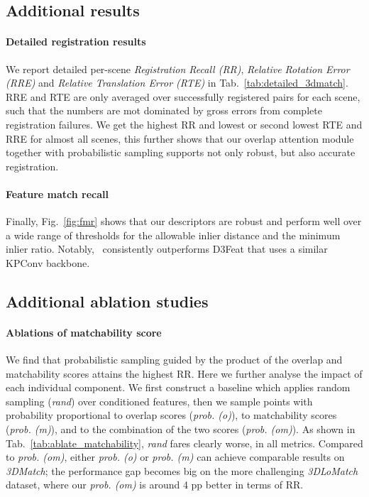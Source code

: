 
\subsection{Additional results}
\label{sec:additional_results_supp}
\paragraph{Detailed registration results}
We report detailed per-scene \textit{Registration Recall (RR)}, \textit{Relative Rotation Error (RRE)} and \textit{Relative Translation Error (RTE)} in Tab.~\ref{tab:detailed_3dmatch}. RRE and RTE are only averaged over successfully registered pairs for each scene, such that the numbers are mot dominated by gross errors from complete registration failures. We get the highest RR and lowest or second lowest RTE and RRE for almost all scenes, this further shows that our overlap attention module together with probabilistic sampling supports not only robust, but also accurate registration.  


\paragraph{Feature match recall}
Finally, Fig.~\ref{fig:fmr} shows that our descriptors are robust and perform well over a wide range of thresholds for the allowable inlier distance and the minimum inlier ratio. Notably, \acro\ consistently outperforms D3Feat that uses a similar KPConv backbone.


\subsection{Additional ablation studies}
\label{sec:addtional_ablation_supp}


\paragraph{Ablations of matchability score}
We find that probabilistic sampling guided by the product of the overlap and matchability scores attains the highest RR. Here we further analyse the impact of each individual component. We first construct a baseline which applies random sampling (\textit{rand}) over conditioned features, then we sample points with probability proportional to overlap scores (\textit{prob. (o)}), to matchability scores (\textit{prob. (m)}), and to the combination of the two scores (\textit{prob. (om)}). As shown in Tab.~\ref{tab:ablate_matchability}, \textit{rand} fares clearly worse, in all metrics. Compared to \textit{prob. (om)}, either \textit{prob. (o)} or \textit{prob. (m)} can achieve comparable results on \emph{3DMatch}; the performance gap becomes big on the more challenging \emph{3DLoMatch} dataset, where our \textit{prob. (om)} is around 4 pp better in terms of RR. 

